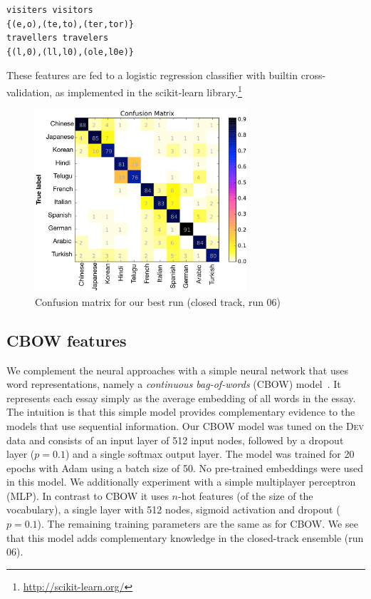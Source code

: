 \documentclass[11pt,letterpaper]{article}
\begin{document}
\begin{verbatim}
visiters visitors
{(e,o),(te,to),(ter,tor)}
travellers travelers
{(l,0),(ll,l0),(ole,l0e)}
\end{verbatim}

These features are fed to a logistic regression classifier with builtin cross-validation, as implemented in the scikit-learn library.\footnote{\url{http://scikit-learn.org/}}

\begin{figure}[ht]
\centering
\includegraphics[width=0.7\textwidth]{confusion_matrix_run06closed}
\caption{Confusion matrix for our best run (closed track, run 06)}
\label{fig:conf_mat}
\end{figure}

\subsection{CBOW features}
We complement the neural approaches with a simple neural network that uses word representations, namely a \textit{continuous bag-of-words} (CBOW)  model~\cite{mikolov2013efficient}. It represents each essay simply as the average embedding of all words in the essay. The intuition is that this simple model provides complementary evidence to the models  that use sequential information. Our CBOW model was tuned on the \textsc{Dev} data and consists of an input layer of 512 input nodes, followed by a dropout layer ($p=0.1$) and a single softmax output layer. The model was trained for 20 epochs with Adam using a batch size of 50. No pre-trained embeddings were used in this model.
We additionally experiment with a simple multiplayer perceptron (MLP). In contrast to CBOW it uses $n$-hot features (of the size of the vocabulary), a single layer with 512 nodes, sigmoid activation and dropout ($p=0.1$). The remaining training parameters are the same as for CBOW. We see that this model adds complementary knowledge in the closed-track ensemble (run 06).
\end{document}
